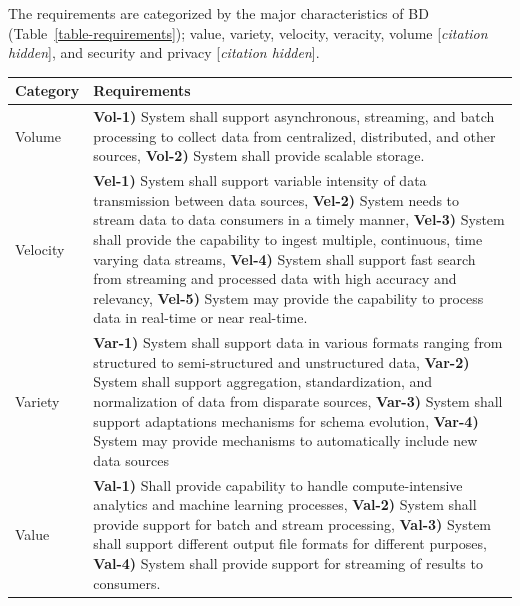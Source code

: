 \documentclass[a4paper,11pt]{article}
\let\cite\citep
\newcommand{\hc}{[\textit{citation hidden}]\textnormal{}}
\begin{document}
The requirements are categorized by the major characteristics of BD (Table~\ref{table-requirements}); value, variety, velocity, veracity, volume %
\hc{},
 and security and privacy 
\hc{}.


    \begin{table}[h!t]
    \centering
    \renewcommand*{\arraystretch}{1.8}
    \begin{tabular}{|l|p{12cm}|}
	\hline
	\textbf{Category} & \textbf{Requirements} \\
        \hline

        Volume &

        \textbf{Vol-1)} System shall support asynchronous, streaming, and batch processing to collect data from centralized, distributed, and other sources, \textbf{Vol-2)} System shall provide scalable storage. 
        \\
        \hline
        Velocity & 
        
        \textbf{Vel-1)} System shall support variable intensity of data transmission between data sources, \textbf{Vel-2)} System needs to stream data to data consumers in a timely manner, \textbf{Vel-3)} System shall provide the capability to ingest multiple, continuous, time varying data streams, \textbf{Vel-4)} System shall support fast search from streaming and processed data with high accuracy and relevancy, \textbf{Vel-5)} System may provide the capability to process data in real-time or near real-time. 
        \\ 

        \hline

        Variety & 

        \textbf{Var-1)} System shall support data in various formats ranging from structured to semi-structured and unstructured data, \textbf{Var-2)} System shall support aggregation, standardization, and normalization of data from disparate sources, \textbf{Var-3)} System shall support adaptations mechanisms for schema evolution, \textbf{Var-4)} System may provide mechanisms to automatically include new data sources 
        \\

        \hline

        Value & 
        
        \textbf{Val-1)} Shall provide capability to handle compute-intensive analytics and machine learning processes, \textbf{Val-2)} System shall provide support for batch and stream processing, \textbf{Val-3)} System shall support different output file formats for different purposes, \textbf{Val-4)} System shall provide support for streaming of results to consumers.
        \\


\end{tabular}
\end{table}
\end{document}
